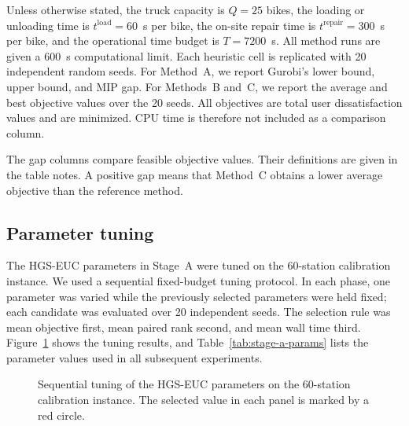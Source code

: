 Unless otherwise stated, the truck capacity is $Q=25$ bikes, the loading or
unloading time is $t^{\mathrm{load}}=60$~s per bike, the on-site repair time is
$t^{\mathrm{repair}}=300$~s per bike, and the operational time budget is
$T=7200$~s. All method runs are given a 600~s computational limit. Each
heuristic cell is replicated with 20 independent random seeds. For Method~A, we
report Gurobi's lower bound, upper bound, and MIP gap. For Methods~B and~C, we
report the average and best objective values over the 20 seeds. All objectives
are total user dissatisfaction values and are minimized. CPU time is therefore
not included as a comparison column.

The gap columns compare feasible objective values. Their definitions are given
in the table notes. A positive gap means that Method~C obtains a lower average
objective than the reference method.

\subsection{Parameter tuning}\label{sec:exp-tuning}

The HGS-EUC parameters in Stage~A were tuned on the 60-station calibration
instance. We used a sequential fixed-budget tuning protocol. In each phase, one
parameter was varied while the previously selected parameters were held fixed;
each candidate was evaluated over 20 independent seeds. The selection rule was
mean objective first, mean paired rank second, and mean wall time third.
Figure~\ref{fig:tuning-result} shows the tuning results, and
Table~\ref{tab:stage-a-params} lists the parameter values used in all subsequent
experiments.

\begin{figure}[t]
  \centering
  \caption{Sequential tuning of the HGS-EUC parameters on the 60-station
  calibration instance. The selected value in each panel is marked by a red
  circle.}
  \label{fig:tuning-result}
\end{figure}

